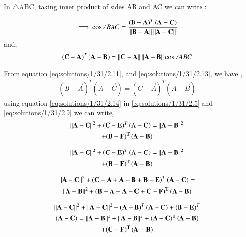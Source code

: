   
   In $\triangle$ABC, taking inner product of sides  AB and AC we can write :
  
 \begin{align}
\implies \cos\angle BAC = \frac{\left( \mathbf{ B - A} \right)^T  \left( \mathbf{A - C } \right)}{\left\lVert\mathbf{ B - A}\right\rVert \left\lVert\mathbf{A - C}\right\rVert} \label{eq:solutions/1/31/2.11}
\end{align}  
  and,
   \begin{align}
  \left( \mathbf{C - A} \right)^T \left( \mathbf{A - B} \right) = \left\lVert\mathbf{C - A}\right\rVert \left\lVert\mathbf{ A - B}\right\rVert \cos\angle ABC \label{eq:solutions/1/31/2.13}
  \end{align}
  
  From equation \ref{eq:solutions/1/31/2.11}, and \ref{eq:solutions/1/31/2.13}, we have ,
  \begin{multline} 
    \left( \vec{ B - A} \right)^T\left( \vec{A - C } \right) =  \left( \vec{ C - A} \right)^T  \left( \vec{A - B } \right) \label{eq:solutions/1/31/2.14}
   \end{multline} 
 using equation \ref{eq:solutions/1/31/2.14} in \ref{eq:solutions/1/31/2.5} and \ref{eq:solutions/1/31/2.9} we can write,
   \begin{multline} 
   \left\lVert\mathbf{A-C}\right\rVert^2 + \left ( \mathbf{ C-E}\right)^T \left( \mathbf{A - C} \right) =  \left\lVert\mathbf{A - B}\right\rVert^2 \\ + \mathbf{\left (  B - F\right)^{T} \left( A - B \right)}
    \end{multline} 
   
  \begin{multline} 
\left\lVert\mathbf{A - C}\right\rVert^2 + \left ( \mathbf{ C - E }\right)^T \left( \mathbf{A - C} \right)  =  \left\lVert\mathbf{A - B}\right\rVert^2 \\ + \mathbf{\left (  B - F\right)^{T} \left( A - B \right)}
 \end{multline}   
   
    \begin{multline} 
  \left\lVert\mathbf{A - C}\right\rVert^2 + \left ( \mathbf{ C - A + A - B +B - E }\right)^T \left( \mathbf{A - C} \right)  =  \\ \left\lVert\mathbf{A - B}\right\rVert^2 + \mathbf{\left (  B - A + A - C + C - F\right)^{T} \left( A - B \right)}
   \end{multline}   
  
 \begin{multline} 
\left\lVert\mathbf{A - C}\right\rVert^2 +  \left\lVert\mathbf{A - C}\right\rVert^2 + \left ( \mathbf{  A - B  }\right)^T \left( \mathbf{A - C} \right) + \left ( \mathbf{   B - E }\right)^T \\ \left( \mathbf{A - C} \right) =   \left\lVert\mathbf{A - B}\right\rVert^2 + \left\lVert\mathbf{A - B}\right\rVert^2 + \mathbf{\left ( A - C \right)^{T} \left( A - B \right)}  \\ +  \mathbf{\left (  C - F\right)^{T} \left( A - B \right)} \label{eq:solutions/1/31/2.18}
 \end{multline}    
  
